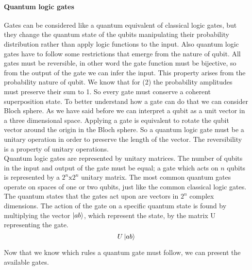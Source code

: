 \documentclass[main.tex]{subfiles}
\theoremstyle{definition}
\begin{document}
	\paragraph{Quantum logic gates}Gates can be considered like a quantum equivalent of classical logic gates, but they change the 
	quantum state of the qubits manipulating their probability distribution rather than apply logic functions to the input. 
	Also quantum logic gates have to follow some restrictions that emerge from the nature of qubit. All gates must be 
	reversible, in other word the gate function must be	bijective, so from the output of the gate we can infer the input.
	This property arises from the probability nature of qubit. We know that for (2) the probability amplitudes must preserve their
	sum to 1. So every gate must conserve a coherent superposition state. To better understand how a gate can do that we can consider
	Bloch sphere. As we have said before we can interpret a qubit as a unit vector in a three dimensional space. Applying a gate is 
	equivalent to rotate the qubit vector around the origin in the Bloch sphere. So a quantum logic gate must be a unitary operation 
	in order to preserve the length of the vector. The reversibility is a property of unitary operations.\\
	
	Quantum logic gates are represented by unitary matrices. The number of qubits in the input and output of the gate must be 
	equal; a gate which acts on $n$ qubits is represented by a $2^n\text{x}2^n$ unitary matrix. The most common quantum gates operate on 
	spaces of one or two qubits, just like the common classical logic gates. The quantum states that the gates act upon are vectors 
	in $2^n$ complex dimensions. The action of the gate on a specific quantum state is found by multiplying 
	the vector $\ket{ab}$, which represent the state, by the matrix U representing the gate.
	\begin{equation}
	U\ket{ab}
	\end{equation}
	
	Now that we know which rules a quantum gate must follow, we can present the available gates.
	
\end{document}
